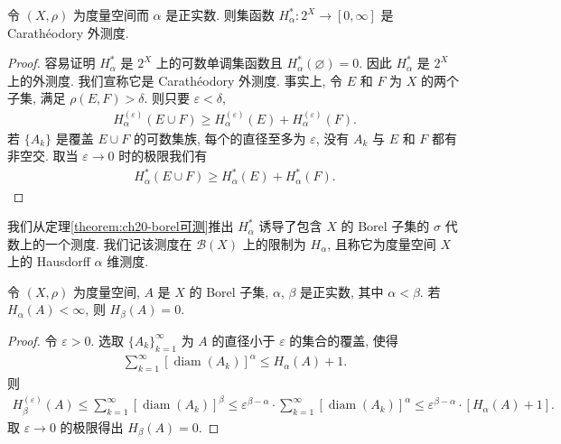 \documentclass[../../main.tex]{subfiles}
\begin{document}
\begin{proposition}\label{proposition:ch20-hausdorff外测度}
令 $(X,\rho)$ 为度量空间而 $\alpha$ 是正实数. 则集函数 $H_{\alpha}^{*}:2^{X}\to[0,\infty]$ 是 Carath\'eodory 外测度.
\end{proposition}

\begin{proof}
容易证明 $H_{\alpha}^{*}$ 是 $2^{X}$ 上的可数单调集函数且 $H_{\alpha}^{*}(\varnothing)=0$. 因此 $H_{\alpha}^{*}$ 是 $2^{X}$ 上的外测度. 我们宣称它是 Carath\'eodory 外测度. 事实上, 令 $E$ 和 $F$ 为 $X$ 的两个子集, 满足 $\rho(E,F)>\delta$. 则只要 $\varepsilon<\delta$,
\begin{align*}
H_{\alpha}^{(\varepsilon)}(E\cup F)\geqslant H_{\alpha}^{(\varepsilon)}(E)+H_{\alpha}^{(\varepsilon)}(F).
\end{align*}
若 $\{A_{k}\}$ 是覆盖 $E\cup F$ 的可数集族, 每个的直径至多为 $\varepsilon$, 没有 $A_{k}$ 与 $E$ 和 $F$ 都有非空交. 取当 $\varepsilon\to 0$ 时的极限我们有
\begin{align*}
H_{\alpha}^{*}(E\cup F)\geqslant H_{\alpha}^{*}(E)+H_{\alpha}^{*}(F).
\end{align*}
\end{proof}

我们从定理\cref{theorem:ch20-borel可测}推出 $H_{\alpha}^{*}$ 诱导了包含 $X$ 的 Borel 子集的 $\sigma$ 代数上的一个测度. 我们记该测度在 $\mathcal{B}(X)$ 上的限制为 $H_{\alpha}$, 且称它为度量空间 $X$ 上的 Hausdorff $\alpha$ 维测度.

\begin{proposition}\label{proposition:ch20-hausdorff零测}
令 $(X,\rho)$ 为度量空间, $A$ 是 $X$ 的 Borel 子集, $\alpha$, $\beta$ 是正实数, 其中 $\alpha<\beta$. 若 $H_{\alpha}(A)<\infty$, 则 $H_{\beta}(A)=0$.
\end{proposition}

\begin{proof}
令 $\varepsilon>0$. 选取 $\{A_{k}\}_{k=1}^{\infty}$ 为 $A$ 的直径小于 $\varepsilon$ 的集合的覆盖, 使得
\begin{align*}
\sum_{k=1}^{\infty}[\operatorname{diam}(A_{k})]^{\alpha}\leqslant H_{\alpha}(A)+1.
\end{align*}
则
\begin{align*}
H_{\beta}^{(\varepsilon)}(A)\leqslant\sum_{k=1}^{\infty}[\operatorname{diam}(A_{k})]^{\beta}\leqslant\varepsilon^{\beta-\alpha}\cdot\sum_{k=1}^{\infty}[\operatorname{diam}(A_{k})]^{\alpha}\leqslant\varepsilon^{\beta-\alpha}\cdot[H_{\alpha}(A)+1].
\end{align*}
取 $\varepsilon\to 0$ 的极限得出 $H_{\beta}(A)=0$.
\end{proof}
\end{document}
